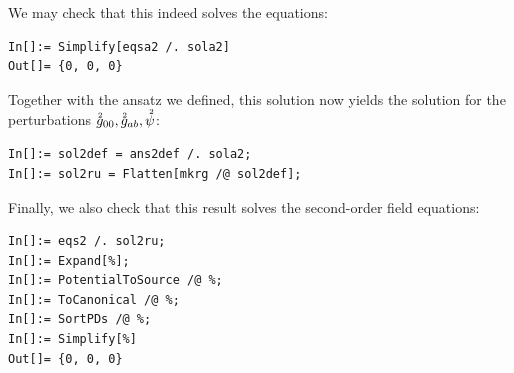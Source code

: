 \documentclass[notitlepage,a4paper,aps,prd,onecolumn,superscriptaddress,nofootinbib,groupedaddress,longbibliography]{revtex4-1}
\newcommand{\order}[2]{\accentset{#2}{#1}}
\begin{document}
We may check that this indeed solves the equations:
\begin{lstlisting}
In[]:= Simplify[eqsa2 /. sola2]
Out[]= {0, 0, 0}
\end{lstlisting}
Together with the ansatz we defined, this solution now yields the solution for the perturbations \(\order{g}{2}_{00}, \order{g}{2}_{ab}, \order{\psi}{2}\):
\begin{lstlisting}
In[]:= sol2def = ans2def /. sola2;
In[]:= sol2ru = Flatten[mkrg /@ sol2def];
\end{lstlisting}
Finally, we also check that this result solves the second-order field equations:
\begin{lstlisting}
In[]:= eqs2 /. sol2ru;
In[]:= Expand[%];
In[]:= PotentialToSource /@ %;
In[]:= ToCanonical /@ %;
In[]:= SortPDs /@ %;
In[]:= Simplify[%]
Out[]= {0, 0, 0}
\end{lstlisting}
\end{document}
